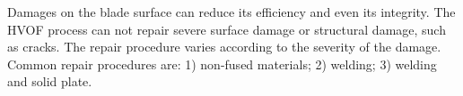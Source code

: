 
Damages on the blade surface can reduce its efficiency and even its integrity.
The HVOF process can not repair severe surface damage or structural damage,
such as cracks. The repair procedure varies according to the severity of the
damage. Common repair procedures are: 1) non-fused materials; 2) welding; 3)
welding and solid plate.




